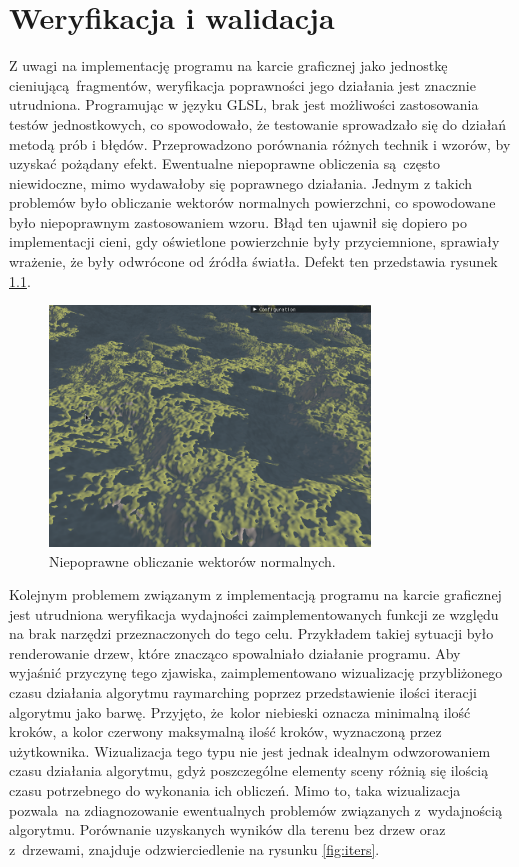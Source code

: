 \chapter{Weryfikacja i walidacja}
\label{ch:06}

Z uwagi na implementację programu na karcie graficznej jako jednostkę cieniującą fragmentów, weryfikacja poprawności jego działania jest znacznie utrudniona. Programując w języku GLSL, brak jest możliwości zastosowania testów jednostkowych, co spowodowało, że testowanie sprowadzało się do działań metodą prób i błędów. Przeprowadzono porównania różnych technik i wzorów, by uzyskać pożądany efekt. Ewentualne niepoprawne obliczenia są często niewidoczne, mimo wydawałoby się poprawnego działania. Jednym z takich problemów było obliczanie wektorów normalnych powierzchni, co spowodowane było niepoprawnym zastosowaniem wzoru. Błąd ten ujawnił się dopiero po implementacji cieni, gdy oświetlone powierzchnie były przyciemnione, sprawiały wrażenie, że były odwrócone od źródła światła. Defekt ten przedstawia rysunek \ref{fig:normals}.

\begin{figure}[H]
\centering
\includegraphics[width=0.76\textwidth]{./graf/norm.png}
\caption{Niepoprawne obliczanie wektorów normalnych.}
\label{fig:normals}
\end{figure}

Kolejnym problemem związanym z implementacją programu na karcie graficznej jest utrudniona weryfikacja wydajności zaimplementowanych funkcji ze względu na brak narzędzi przeznaczonych do tego celu. Przykładem takiej sytuacji było renderowanie drzew, które znacząco spowalniało działanie programu.
Aby wyjaśnić przyczynę tego zjawiska, zaimplementowano wizualizację przybliżonego czasu działania algorytmu raymarching poprzez przedstawienie ilości iteracji algorytmu jako barwę. Przyjęto, że~kolor niebieski oznacza minimalną ilość kroków, a kolor czerwony maksymalną ilość kroków, wyznaczoną przez użytkownika. Wizualizacja tego typu nie jest jednak idealnym odwzorowaniem czasu działania algorytmu, gdyż poszczególne elementy sceny różnią się ilością czasu potrzebnego do wykonania ich obliczeń. Mimo to, taka wizualizacja pozwala~na zdiagnozowanie ewentualnych problemów związanych z~wydajnością algorytmu. Porównanie uzyskanych wyników dla terenu bez drzew oraz z~drzewami, znajduje odzwierciedlenie na rysunku \ref{fig:iters}.

